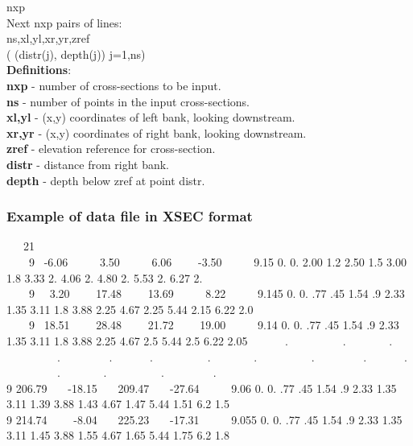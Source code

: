 \documentclass{article}
\begin{document}
\noindent
nxp\\
Next nxp pairs of lines:\\
ns,xl,yl,xr,yr,zref\\
( (distr(j), depth(j)) j=1,ns)\\


\noindent\textbf{Definitions}:\\ 

\noindent
\textbf{nxp} - number of cross-sections to be input.\\
\textbf{ns}   - number of points in the input cross-sections.\\
\textbf{xl,yl} - (x,y) coordinates of left bank, looking downstream.\\
\textbf{xr,yr} - (x,y) coordinates of right bank, looking downstream.\\
\textbf{zref} - elevation reference for cross-section.\\
\textbf{distr} - distance from right bank.\\
\textbf{depth} - depth below zref at point distr.\\

\subsubsection[Example of data file in XSEC format]{Example of data file in XSEC format}

\ \ \ 21\\ \ \ \ \ 9 \ {}-6.06 \ \ \ \ \ 3.50 \ \ \ \ \ 6.06 \ \ \ \ {}-3.50 \ \ \ \ \ 9.15 0. 0. 2.00 1.2 2.50 1.5 3.00 1.8 3.33 2. 4.06 2. 4.80 2. 5.53 2. 6.27 2.\\ \ \ \ \ 9 \ \ 3.20 \ \ \ \ 17.48 \ \ \ \ 13.69 \ \ \ \ \ 8.22 \ \ \ \ \ 9.145 0. 0. .77 .45 1.54 .9 2.33 1.35 3.11 1.8 3.88 2.25 4.67 2.25 5.44 2.15 6.22 2.0\\ \ \ \ \ 9 \ 18.51 \ \ \ \ 28.48 \ \ \ \ 21.72 \ \ \ \ 19.00 \ \ \ \ \ 9.14 0. 0. .77 .45 1.54 .9 2.33 1.35 3.11 1.8 3.88 2.25 4.67 2.5 5.44 2.5 6.22 2.05 \ \ \ \ \ \ . \ \ \ \ \ \ \ \ \ . \ \ \ \ \ \ \ . \ \ \ \ \ \ \ \ \ . \ \ \ \ \ \ \ \ . \ \ \ \ \ \ . \ \ \ \ \ \ \ \ \ . \ \ \ \ \ \ \ . \ \ \ \ \ \ \ \ \ . \ \ \ \ \ \ \ \ . \ \ \ \ \ \ . \ \ \ \ \ \ \ \ \ . \ \ \ \ \ \ \ . \ \ \ \ \ \ \ \ \ . \ \ \ \ \ \ \ \ . \ \ \ \ \\9 206.79 \ \ \ {}-18.15 \ \ \ 209.47 \ \ \ {}-27.64 \ \ \ \ \ 9.06 0. 0. .77 .45 1.54 .9 2.33 1.35 3.11 1.39 3.88 1.43 4.67 1.47 5.44 1.51 6.2 1.5 \\ 9 214.74 \ \ \ \ {}-8.04 \ \ \ 225.23 \ \ \ {}-17.31 \ \ \ \ \ 9.055 0. 0. .77 .45 1.54 .9 2.33 1.35 3.11 1.45 3.88 1.55 
4.67 1.65 5.44 1.75 6.2 1.8
\end{document}
